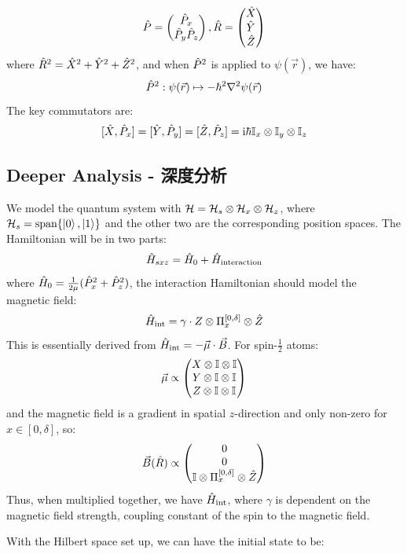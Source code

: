 $$\hat{P} = \begin{pmatrix}
    \hat{P}_x \\ \hat{P}_y \hat{P}_z
\end{pmatrix}, \hat{R} = \begin{pmatrix}
    \hat{X} \\ \hat{Y} \\ \hat{Z}
\end{pmatrix}$$
where $\hat{R}^2 = \hat{X}^2 + \hat{Y}^2 + \hat{Z}^2$, and when $\hat{P}^2$ is applied to $\psi(\vec{r})$, we have:
$$\hat{P}^2: \psi(\vec{r}) \mapsto -\hbar^2 \nabla^2 \psi(\vec{r})$$
The key commutators are:
$$[\hat{X}, \hat{P}_x] = [\hat{Y}, \hat{P}_y] = [\hat{Z}, \hat{P}_z] = \mathrm{i} \hbar \mathbb{I}_x \otimes \mathbb{I}_y \otimes \mathbb{I}_z$$

\subsection{Deeper Analysis - 深度分析}
We model the quantum system with $\mathcal{H} = \mathcal{H}_s \otimes \mathcal{H}_x \otimes \mathcal{H}_z$, where $\mathcal{H}_s = \text{span}\{\ket{0}, \ket{1}\}$ and the other two are the corresponding position spaces. The Hamiltonian will be in two parts:
$$\hat{H}_{sxz} = \hat{H}_0 + \hat{H}_{\text{interaction}}$$
where $\hat{H}_0 = \frac{1}{2\mu}(\hat{P}_x^2 + \hat{P}_z^2)$, the interaction Hamiltonian should model the magnetic field:
$$\hat{H}_{\text{int}} = \gamma \cdot Z \otimes \Pi_{x}^{[0, \delta]} \otimes \hat{Z}$$
This is essentially derived from $\hat{H}_{\text{int}} = -\vec{\mu} \cdot \vec{B}$. For spin-$\frac{1}{2}$ atoms:
$$\vec{\mu} \propto \begin{pmatrix}
    X \otimes \mathbb{I} \otimes \mathbb{I} \\
    Y \otimes \mathbb{I} \otimes \mathbb{I} \\
    Z \otimes \mathbb{I} \otimes \mathbb{I}
\end{pmatrix}$$
and the magnetic field is a gradient in spatial $z$-direction and only non-zero for $x \in [0, \delta]$, so:
$$\vec{B}(\hat{R}) \propto \begin{pmatrix}
    0 \\ 0 \\
    \mathbb{I} \otimes \Pi_{x}^{[0, \delta]} \otimes \hat{Z}
\end{pmatrix}$$
Thus, when multiplied together, we have $\hat{H}_{\text{int}}$, where $\gamma$ is dependent on the magnetic field strength, coupling constant of the spin to the magnetic field. \par
With the Hilbert space set up, we can have the initial state to be:
